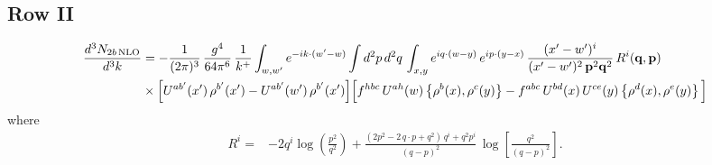 \documentclass[9pt]{article}
\numberwithin{equation}{section}
\begin{document}
\subsection{Row II}
\begin{align}
\frac{d^{3}N_{2b\,\rm NLO}}{d^{3}k} & = -\frac{1}{(2\pi)^{3}}\,\frac{g^{4}}{64\pi^{6}}\,\frac{1}{k^{+}}\int_{w,w'} e^{-ik\cdot(w'-w)}
\int d^{2}p\,d^{2}q\,\int_{x,y} e^{iq\cdot(w-y)}\,e^{ip\cdot(y-x)}\,\frac{(x'-w')^{i}}{(x'-w')^{2}\,\mathbf{p}^{2}\mathbf{q}^{2}}\,R^{i}(\mathbf{q},\mathbf{p})\notag\\ &\times\Big[U^{ab'}(x')\,\rho^{b'}(x')-U^{ab'}(w')\,\rho^{b'}(x')\Big]
\Big[f^{hbc}\,U^{ah}(w)\left\{\rho^{b}(x),\rho^{c}(y)\right\}-f^{abc}\,U^{bd}(x)\,U^{ce}(y)\left\{\rho^{d}(x),\rho^{e}(y)\right\}\Big]
\end{align}
where
\begin{align}
R^{i} =& -2q^{i}\log\left(\frac{p^{2}}{q^{2}}\right)
+\frac{(2p^{2}-2\,q\cdot p+q^{2})\,q^{i}+q^{2}p^{i}}{(q-p)^{2}}\,
\log\left[\frac{q^{2}}{(q-p)^{2}}\right].
\end{align}
\end{document}
